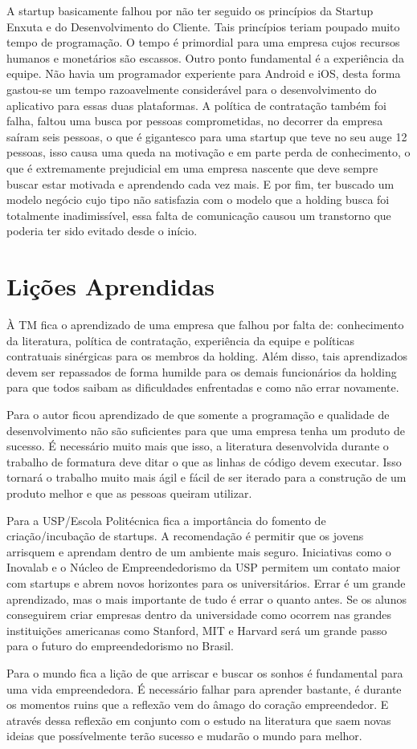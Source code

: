 A startup basicamente falhou por não ter seguido os princípios da Startup Enxuta e do Desenvolvimento do Cliente. Tais princípios teriam poupado muito tempo de programação. O tempo é primordial para uma empresa cujos recursos humanos e monetários são escassos. Outro ponto fundamental é a experiência da equipe. Não havia um programador experiente para Android e iOS, desta forma gastou-se um tempo razoavelmente considerável para o desenvolvimento do aplicativo para essas duas plataformas. A política de contratação também foi falha, faltou uma busca por pessoas comprometidas, no decorrer da empresa saíram seis pessoas, o que é gigantesco para uma startup que teve no seu auge 12 pessoas, isso causa uma queda na motivação e em parte perda de conhecimento, o que é extremamente prejudicial em uma empresa nascente que deve sempre buscar estar motivada e aprendendo cada vez mais. E por fim, ter buscado um modelo negócio cujo tipo não satisfazia com o modelo que a holding busca foi totalmente inadimissível, essa falta de comunicação causou um transtorno que poderia ter sido evitado desde o início.

\section{Lições Aprendidas}
\label{sec:licoes_aprendidas}

À TM fica o aprendizado de uma empresa que falhou por falta de: conhecimento da literatura, política de contratação, experiência da equipe e políticas contratuais sinérgicas para os membros da holding. Além disso, tais aprendizados devem ser repassados de forma humilde para os demais funcionários da holding para que todos saibam as dificuldades enfrentadas e como não errar novamente.

Para o autor ficou aprendizado de que somente a programação e qualidade de desenvolvimento não são suficientes para que uma empresa tenha um produto de sucesso. É necessário muito mais que isso, a literatura desenvolvida durante o trabalho de formatura deve ditar o que as linhas de código devem executar. Isso tornará o trabalho muito mais ágil e fácil de ser iterado para a construção de um produto melhor e que as pessoas queiram utilizar.

Para a USP/Escola Politécnica fica a importância do fomento de criação/incubação de startups. A recomendação é permitir que os jovens arrisquem e aprendam dentro de um ambiente mais seguro. Iniciativas como o Inovalab e o Núcleo de Empreendedorismo da USP permitem um contato maior com startups e abrem novos horizontes para os universitários. Errar é um grande aprendizado, mas o mais importante de tudo é errar o quanto antes. Se os alunos conseguirem criar empresas dentro da universidade como ocorrem nas grandes instituições americanas como Stanford, MIT e Harvard será um grande passo para o futuro do empreendedorismo no Brasil.

Para o mundo fica a lição de que arriscar e buscar os sonhos é fundamental para uma vida empreendedora. É necessário falhar para aprender bastante, é durante os momentos ruins que a reflexão vem do âmago do coração empreendedor. E através dessa reflexão em conjunto com o estudo na literatura que saem novas ideias que possívelmente terão sucesso e mudarão o mundo para melhor.
